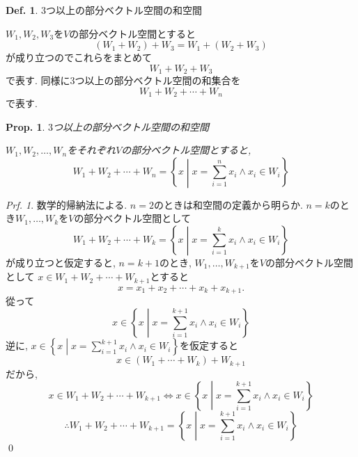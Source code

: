 \documentclass[a4paper,10pt,report]{amsart}
\theoremstyle{plain}
\newtheorem{prop}{Prop.}[section]
\theoremstyle{definition}
\newtheorem{defn}{Def.}[section]
\theoremstyle{remark}
\newtheorem{prf}{Prf.}
\begin{document}
\begin{leftbar}
    \begin{defn}\(3\)つ以上の部分ベクトル空間の和空間\par
        \(W_{1},W_{2},W_{3}\)を\(V\)の部分ベクトル空間とすると
        \begin{equation*}
            (W_{1}+W_{2})+W_{3}=W_{1}+(W_{2}+W_{3})
        \end{equation*}
        が成り立つのでこれらをまとめて
        \begin{equation}
            W_{1}+W_{2}+W_{3}
        \end{equation}
        で表す. 同様に3つ以上の部分ベクトル空間の和集合を
        \begin{equation}
            W_{1}+W_{2}+\cdots+W_{n}
        \end{equation}
        で表す. 
    \end{defn}
\end{leftbar}
\begin{leftbar}
    \begin{prop}\(3\)つ以上の部分ベクトル空間の和空間\par
        \(W_{1},W_{2},\dots,W_{n}\)をそれぞれ\(V\)の部分ベクトル空間とすると,
        \begin{equation}
            W_{1}+W_{2}+\cdots+W_{n}=\left \{x\middle|x=\sum_{i=1}^{n}x_{i}\wedge x_{i}\in W_{i}\right \}
        \end{equation}
    \end{prop}
\end{leftbar}
\begin{prf}
    数学的帰納法による. \(n=2\)のときは和空間の定義から明らか. 
    \(n=k\)のとき\(W_{1},\dots,W_{k}\)を\(V\)の部分ベクトル空間として
    \begin{equation*}
        W_{1}+W_{2}+\cdots+W_{k}=\left \{x\middle|x=\sum_{i=1}^{k}x_{i}\wedge x_{i}\in W_{i}\right \}
    \end{equation*}
    が成り立つと仮定すると, \(n=k+1\)のとき, \(W_{1},\dots,W_{k+1}\)を\(V\)の部分ベクトル空間として
    \(x\in W_{1}+W_{2}+\cdots+W_{k+1}\)とすると
    \begin{equation*}
        x=x_{1}+x_{2}+\cdots+x_{k}+x_{k+1}.
    \end{equation*}
    從って
    \begin{equation*}
        x\in \left \{x\middle|x=\sum_{i=1}^{k+1}x_{i}\wedge x_{i}\in W_{i}\right \}
    \end{equation*}
    逆に, \(x\in \left \{x\middle|x=\sum_{i=1}^{k+1}x_{i}\wedge x_{i}\in W_{i}\right \} \)を仮定すると
    \begin{equation*}
        x\in (W_{1}+\cdots+W_{k})+W_{k+1}
    \end{equation*}
    だから, 
    \begin{equation*}
        x\in W_{1}+W_{2}+\cdots+W_{k+1}\Leftrightarrow x\in \left \{x\middle|x=\sum_{i=1}^{k+1}x_{i}\wedge x_{i}\in W_{i}\right \}
    \end{equation*}
    \begin{equation*}
        \therefore W_{1}+W_{2}+\cdots+W_{k+1}=\left \{x\middle|x=\sum_{i=1}^{k+1}x_{i}\wedge x_{i}\in W_{i}\right \}
    \end{equation*}
    \qed{}
\end{prf}
\end{document}

